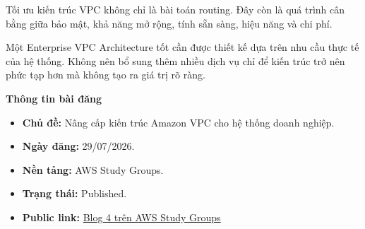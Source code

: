 Tối ưu kiến trúc VPC không chỉ là bài toán routing. Đây còn là quá trình
cân bằng giữa bảo mật, khả năng mở rộng, tính sẵn sàng, hiệu năng và chi
phí.

Một Enterprise VPC Architecture tốt cần được thiết kế dựa trên nhu cầu
thực tế của hệ thống. Không nên bổ sung thêm nhiều dịch vụ chỉ để kiến
trúc trở nên phức tạp hơn mà không tạo ra giá trị rõ ràng.

\vspace{0.5em}\noindent\textbf{Thông tin bài đăng}\par

\begin{itemize}
\tightlist
\item
  \textbf{Chủ đề:} Nâng cấp kiến trúc Amazon VPC cho hệ thống doanh
  nghiệp.
\item
  \textbf{Ngày đăng:} 29/07/2026.
\item
  \textbf{Nền tảng:} AWS Study Groups.
\item
  \textbf{Trạng thái:} Published.
\item
  \textbf{Public link:}
  \href{https://www.facebook.com/groups/awsstudygroupfcj/permalink/2225997548165205/\#}{Blog
  4 trên AWS Study Groups}
\end{itemize}
